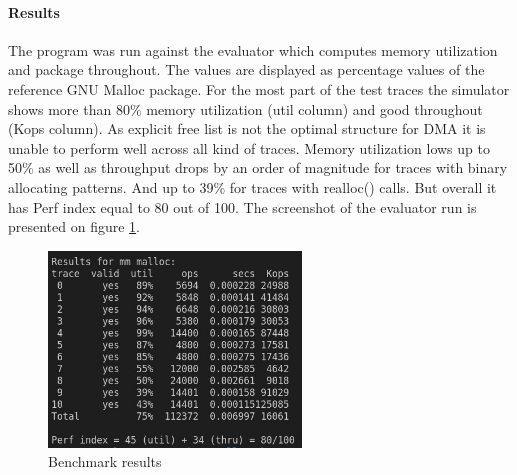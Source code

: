 \documentclass{article}
\begin{document}
\paragraph{Results}
The program was run against the evaluator which computes memory utilization and package throughout.
The values are displayed as percentage values of the reference GNU Malloc package.
For the most part of the test traces the simulator shows more than 80\% memory utilization (util column)
and good throughout (Kops column). As explicit free list is not the optimal structure 
for DMA it is unable to perform well across all kind of traces. 
Memory utilization lows up to 50\% as well as throughput drops by an order of magnitude for traces with binary allocating patterns. 
And up to 39\% for traces with realloc() calls. But overall it has Perf index equal to 80 out of 100.
The screenshot of the evaluator run is presented on figure \ref{fig:test-run}.
\begin{figure}[h]
    \includegraphics[width=0.6\textwidth]{evaluation.jpg}
    \centering
    \caption{Benchmark results}
    \label{fig:test-run}
\end{figure}
\end{document}
